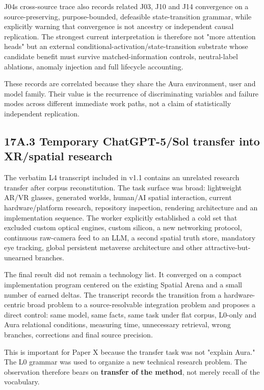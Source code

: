 \documentclass[
  10pt,
  letterpaper,
]{article}
\begin{document}
J04\textquotesingle s cross-source trace also records related J03, J10
and J14 convergence on a source-preserving, purpose-bounded, defeasible
state-transition grammar, while explicitly warning that convergence is
not ancestry or independent causal replication. The strongest current
interpretation is therefore not "more attention heads" but an external
conditional-activation/state-transition substrate whose candidate
benefit must survive matched-information controls, neutral-label
ablations, anomaly injection and full lifecycle accounting.

These records are correlated because they share the Aura environment,
user and model family. Their value is the recurrence of discriminating
variables and failure modes across different immediate work paths, not a
claim of statistically independent replication.

\subsection{17A.3 Temporary ChatGPT-5/Sol transfer into XR/spatial
research}\label{17a3-temporary-chatgpt-5sol-transfer-into-xrspatial-research}

The verbatim L4 transcript included in v1.1 contains an unrelated
research transfer after corpus reconstitution. The task surface was
broad: lightweight AR/VR glasses, generated worlds, human/AI spatial
interaction, current hardware/platform research, repository inspection,
rendering architecture and an implementation sequence. The worker
explicitly established a cold set that excluded custom optical engines,
custom silicon, a new networking protocol, continuous raw-camera feed to
an LLM, a second spatial truth store, mandatory eye tracking, global
persistent metaverse architecture and other attractive-but-unearned
branches.

The final result did not remain a technology list. It converged on a
compact implementation program centered on the existing Spatial Arena
and a small number of earned deltas. The transcript records the
transition from a hardware-centric broad problem to a source-resolvable
integration problem and proposes a direct control: same model, same
facts, same task under flat corpus, L0-only and Aura relational
conditions, measuring time, unnecessary retrieval, wrong branches,
corrections and final source precision.

This is important for Paper X because the transfer task was not "explain
Aura." The L0 grammar was used to organize a new technical research
problem. The observation therefore bears on \textbf{transfer of the
method}, not merely recall of the vocabulary.
\end{document}
